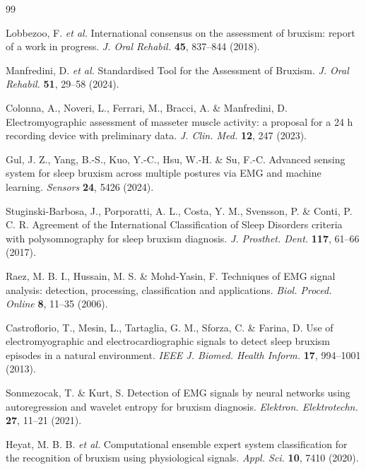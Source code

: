 \documentclass[pdflatex,sn-nature,iicol]{sn-jnl}
\begin{document}
\color{blue}
\begin{thebibliography}{99}
\color{black}

\color{blue}
Lobbezoo, F. \emph{et al.} International consensus on the assessment of bruxism: report of a work in progress. \emph{J. Oral Rehabil.} \textbf{45}, 837--844 (2018).
\color{black}

\color{blue}
Manfredini, D. \emph{et al.} Standardised Tool for the Assessment of Bruxism. \emph{J. Oral Rehabil.} \textbf{51}, 29--58 (2024).
\color{black}

\color{blue}
Colonna, A., Noveri, L., Ferrari, M., Bracci, A. \& Manfredini, D. Electromyographic assessment of masseter muscle activity: a proposal for a 24 h recording device with preliminary data. \emph{J. Clin. Med.} \textbf{12}, 247 (2023).
\color{black}

\color{blue}
Gul, J. Z., Yang, B.-S., Kuo, Y.-C., Hsu, W.-H. \& Su, F.-C. Advanced sensing system for sleep bruxism across multiple postures via EMG and machine learning. \emph{Sensors} \textbf{24}, 5426 (2024).
\color{black}

\color{blue}
Stuginski-Barbosa, J., Porporatti, A. L., Costa, Y. M., Svensson, P. \& Conti, P. C. R. Agreement of the International Classification of Sleep Disorders criteria with polysomnography for sleep bruxism diagnosis. \emph{J. Prosthet. Dent.} \textbf{117}, 61--66 (2017).
\color{black}

\color{blue}
Raez, M. B. I., Hussain, M. S. \& Mohd-Yasin, F. Techniques of EMG signal analysis: detection, processing, classification and applications. \emph{Biol. Proced. Online} \textbf{8}, 11--35 (2006).
\color{black}

\color{blue}
Castroflorio, T., Mesin, L., Tartaglia, G. M., Sforza, C. \& Farina, D. Use of electromyographic and electrocardiographic signals to detect sleep bruxism episodes in a natural environment. \emph{IEEE J. Biomed. Health Inform.} \textbf{17}, 994--1001 (2013).
\color{black}

\color{blue}
Sonmezocak, T. \& Kurt, S. Detection of EMG signals by neural networks using autoregression and wavelet entropy for bruxism diagnosis. \emph{Elektron. Elektrotechn.} \textbf{27}, 11--21 (2021).
\color{black}

\color{blue}
Heyat, M. B. B. \emph{et al.} Computational ensemble expert system classification for the recognition of bruxism using physiological signals. \emph{Appl. Sci.} \textbf{10}, 7410 (2020).
\color{black}


\end{thebibliography}
\end{document}
